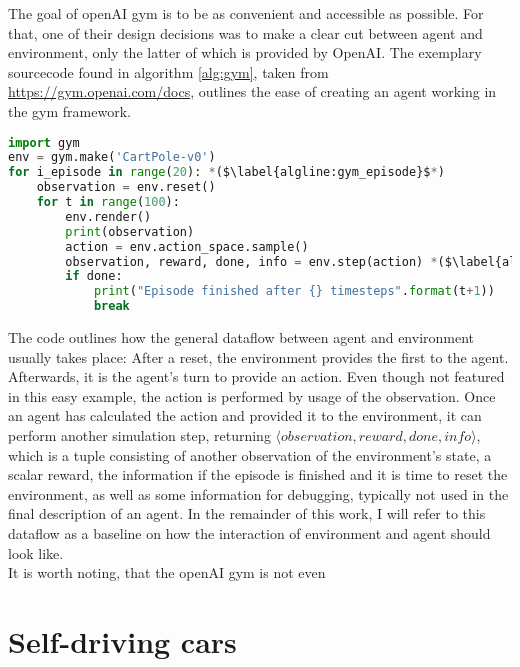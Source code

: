 The goal of openAI gym is to be as convenient and accessible as possible. For that, one of their design decisions was to make a clear cut between agent and environment, only the latter of which is provided by OpenAI. The exemplary sourcecode found in algorithm \ref{alg:gym}, taken from \url{https://gym.openai.com/docs}, outlines the ease of creating an agent working in the gym framework.
\begin{algorithm}[h]
\begin{lstlisting}[language=Python,frame=none]
import gym
env = gym.make('CartPole-v0')
for i_episode in range(20): *($\label{algline:gym_episode}$*)
	observation = env.reset()
	for t in range(100):
		env.render()
		print(observation)
		action = env.action_space.sample()
		observation, reward, done, info = env.step(action) *($\label{algline:gym_envstep}$*)
		if done:
			print("Episode finished after {} timesteps".format(t+1))
			break
\end{lstlisting}%
\caption{Interaction with the openAI gym environment}
\label{alg:gym}
\end{algorithm}
The code outlines how the general dataflow between agent and environment usually takes place: After a reset, the environment provides the first  to the agent. Afterwards, it is the agent's turn to provide an action. Even though not featured in this easy example, the action is performed by usage of the observation. Once an agent has calculated the action and provided it to the environment, it can perform another simulation step, returning $\langle observation, reward, done, info\rangle$, which is a tuple consisting of another observation of the environment's state, a scalar reward, the information if the episode is finished and it is time to reset the environment, as well as some information for debugging, typically not used in the final description of an agent. In the remainder of this work, I will refer to this dataflow as a baseline on how the interaction of environment and agent should look like.\\

It is worth noting, that the openAI gym is not even 


\section{Self-driving cars}

